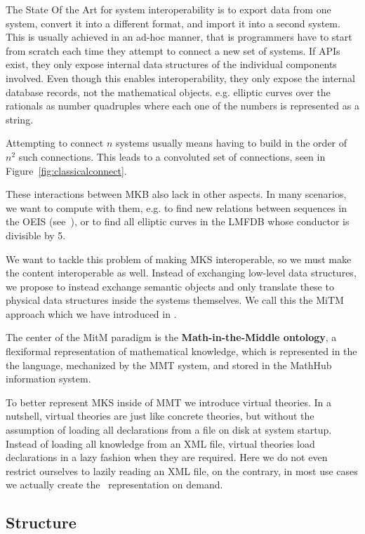 The State Of the Art for system interoperability is to export data from one system, convert it into a different format, and import it into a second system. 
This is usually achieved in an ad-hoc manner, that is programmers have to start from scratch each time they attempt to connect a new set of systems. 
If APIs exist, they only expose internal data structures of the individual components involved. 
Even though this enables interoperability, they only expose the internal database records, not the mathematical objects. e.g. elliptic curves over the rationals as number quadruples where each one of the numbers is represented as a string.

Attempting to connect $n$ systems usually means having to build in the order of $n^2$ such connections. 
This leads to a convoluted set of connections, seen in Figure~\ref{fig:classicalconnect}. 

These interactions between MKB also lack in other aspects. 
In many scenarios, we want to compute with them, e.g. to find new relations between sequences in the OEIS (see~\cite{LuzKoh:fsarfo16}), or to find all elliptic curves in the LMFDB whose conductor is divisible by 5. 

We want to tackle this problem of making MKS interoperable, so we must make the content interoperable as well. 
Instead of exchanging low-level data structures, we propose to instead exchange semantic objects and only translate these to physical data structures inside the systems themselves. 
We call this the MiTM approach which we have introduced in \cite{DehKohKon:iop16}. 

The center of the MitM paradigm is the \textbf{Math-in-the-Middle ontology}, a flexiformal representation of mathematical knowledge, which is represented in the the \omdocmmt language, mechanized by the MMT system, and stored in the MathHub information system. 


To better represent MKS inside of MMT we introduce virtual theories. 
In a nutshell, virtual theories are just like concrete theories, but without the assumption of loading all declarations from a file on disk at system startup. 
Instead of loading all knowledge from an XML file, virtual theories load declarations in a lazy fashion when they are required. 
Here we do not even restrict ourselves to lazily reading an XML file, on the contrary, in most use cases we actually create the \omdocmmt\ representation on demand. 


\subsection*{Structure}\label{sec:intr:structure}

